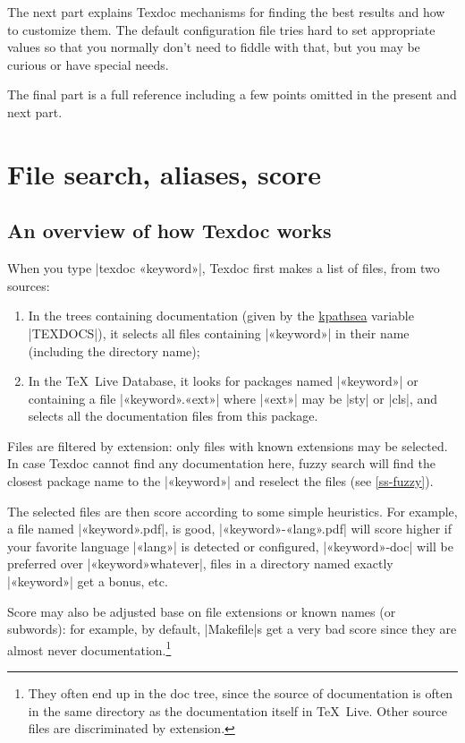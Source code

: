 \documentclass[a4paper, oneside]{scrartcl}
\newcommand\texlive{\TeX~Live\xspace}
\begin{document}
The next part explains Texdoc mechanisms for finding the best results and how
to customize them. The default configuration file tries hard to set appropriate
values so that you normally don't need to fiddle with that, but you may be
curious or have special needs.

The final part is a full reference including a few points omitted in the
present and next part.

\clearpage

\section{File search, aliases, score}

\subsection{An overview of how Texdoc works}

When you type |texdoc «keyword»|, Texdoc first makes a list of files, from two
sources:
\begin{enumerate}
  \item In the trees containing documentation (given by the
    \href{https://www.tug.org/kpathsea/} {kpathsea} variable |TEXDOCS|), it
    selects all files containing |«keyword»| in their name (including the
    directory name);
  \item In the \texlive Database, it looks for packages named
    |«keyword»| or containing a file |«keyword».«ext»| where |«ext»| may be
    |sty| or |cls|, and selects all the documentation files from this package.
\end{enumerate}
Files are filtered by extension: only files with known extensions may be
selected. In case Texdoc cannot find any documentation here, fuzzy search will
find the closest package name to the |«keyword»| and reselect the files (see
\ref{ss-fuzzy}).

The selected files are then score according to some simple heuristics.  For
example, a file named |«keyword».pdf|, is good, |«keyword»-«lang».pdf| will
score higher if your favorite language |«lang»| is detected or configured,
|«keyword»-doc| will be preferred over |«keyword»whatever|, files in a
directory named exactly |«keyword»| get a bonus, etc.

Score may also be adjusted base on file extensions or known names (or
subwords): for example, by default, |Makefile|s get a very bad score since
they are almost never documentation.\footnote{They often end up in the doc
  tree, since the source of documentation is often in the same directory as
  the documentation itself in \texlive. Other source files are discriminated
  by extension.}
\end{document}
